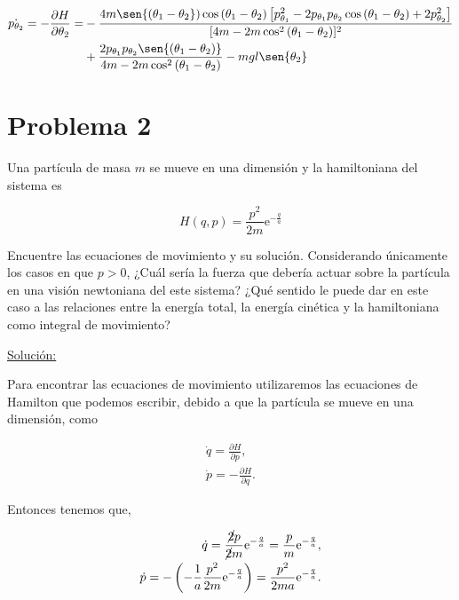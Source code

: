 \documentclass[a4paper,10pt]{article}
\numberwithin{equation}{section}
\newcommand{\euler}{\mathrm{e}}
\begin{document}
\begin{align}
\begin{split}
 \dot{p_{\theta_2}} = - \frac{\partial H}{\partial \theta_2} = 
 &- \frac{4m\sen{(\theta_1 - \theta_2})\cos{(\theta_1 - \theta_2)}
 \left[p_{\theta_1}^2 - 2p_{\theta_1}p_{\theta_2}\cos{(\theta_1 - \theta_2)} + 2p_{\theta_2}^2\right]}{[4m - 2m\cos^2{(\theta_1 - \theta_2)}]^2} \\
 &+ \frac{2p_{\theta_1}p_{\theta_2}\sen{(\theta_1 - \theta_2)}}{4m - 2m\cos^2{(\theta_1 - \theta_2)}} 
 - mgl\sen{\theta_2}
\end{split}
\end{align}

\section{Problema 2}

Una partícula de masa $m$ se mueve en una dimensión y la hamiltoniana del sistema 
es 

$$
H(q,p) = \frac{p^2}{2m}\euler^{-\frac{q}{a}}
$$

Encuentre las ecuaciones de movimiento y su solución. Considerando únicamente los casos 
en que $p>0$, ¿Cuál sería la fuerza que debería actuar sobre la partícula en una visión
newtoniana del este sistema? ¿Qué sentido le puede dar en este caso a las relaciones entre 
la energía total, la energía cinética y la hamiltoniana como integral de movimiento?

\vspace{.3cm}

\underline{Solución:} \vspace{.3cm}

Para encontrar las ecuaciones de movimiento utilizaremos las ecuaciones de Hamilton 
que podemos escribir, debido a que la partícula se mueve en una dimensión, como

\begin{align}
 \dot{q} = \frac{\partial H}{\partial p}, \\
 \dot{p} = - \frac{\partial H}{\partial q}.
\end{align}

Entonces tenemos que,

\begin{align}
\label{eq:2qdot1}
 \dot{q} = \frac{\cancel{2}p}{\cancel{2}m}\euler^{-\frac{q}{a}}
 = \frac{p}{m}\euler^{-\frac{q}{a}}, \\
\label{eq:2pdot1}
 \dot{p} = - \left(- \frac{1}{a}\frac{p^2}{2m}\euler^{-\frac{q}{a}}\right)
 = \frac{p^2}{2ma}\euler^{-\frac{q}{a}}.
\end{align}
\end{document}
